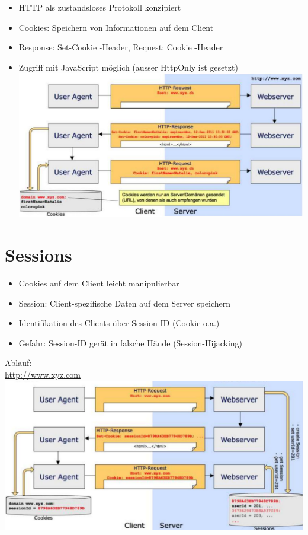 \begin{itemize}
  \item HTTP als zustandsloses Protokoll konzipiert
  \item Cookies: Speichern von Informationen auf dem Client
  \item Response: Set-Cookie -Header, Request: Cookie -Header
  \item Zugriff mit JavaScript möglich (ausser HttpOnly ist gesetzt)\\
\includegraphics[width=\linewidth]{images/2024_12_29_858f09cde51177c71657g-31}
\end{itemize}

\section*{Sessions}
\begin{itemize}
  \item Cookies auf dem Client leicht manipulierbar
  \item Session: Client-spezifische Daten auf dem Server speichern
  \item Identifikation des Clients über Session-ID (Cookie o.a.)
  \item Gefahr: Session-ID gerät in falsche Hände (Session-Hijacking)
\end{itemize}

Ablauf:\\
\href{http://www.xyz.com}{http://www.xyz.com}\\
\includegraphics[width=\linewidth]{images/2024_12_29_858f09cde51177c71657g-31(1)}

